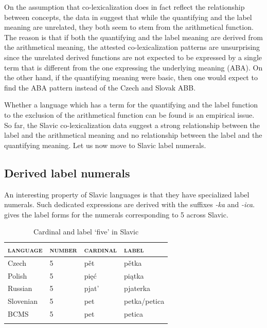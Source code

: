 \documentclass[output=paper]{langscibook}
\begin{document}
On the assumption that co-lexicalization does in fact reflect the relationship between concepts, the data in  suggest that while the quantifying and the label meaning are unrelated, they both seem to stem from the arithmetical function. The reason is that if both the quantifying and the label meaning are derived from the arithmetical meaning, the attested co-lexicalization patterns are unsurprising since the unrelated derived functions are not expected to be expressed by a single term that is different from the one expressing the underlying meaning (ABA). On the other hand, if the quantifying meaning were basic, then one would expect to find the ABA pattern instead of the Czech and Slovak ABB.

Whether a language which has a term for the quantifying and the label function to the exclusion of the arithmetical function can be found is an empirical issue. So far, the Slavic co-lexicalization data suggest a strong relationship between the label and the arithmetical meaning and no relationship between the label and the quantifying meaning. Let us now move to Slavic label numerals.
	
	\subsection{Derived label numerals}\label{sec:derived-label-numerals}

An interesting property of Slavic languages is that they have specialized label numerals. Such dedicated expressions are derived with the suffixes \textit{-ka} and \textit{-ica}.  gives the label forms for the numerals corresponding to 5 across Slavic. 

	\begin{table}[h!]	
	\caption{Cardinal and label `five' in Slavic}
\label{tab:cardinal-and-label-five}
\begin{tabular}{llll}
\lsptoprule
\textsc{language} & \textsc{number} & \textsc{cardinal} & \textsc{label}       \\ \midrule
Czech      & 5 & pět      & pětka        \\
Polish     & 5 & pięć     & piątka       \\
Russian    & 5 & pjat'    & pjaterka     \\
Slovenian  & 5 & pet      & petka/petica \\
BCMS       & 5 & pet      & petica       \\ 
\lspbottomrule
\end{tabular}
	\end{table}
\end{document}
